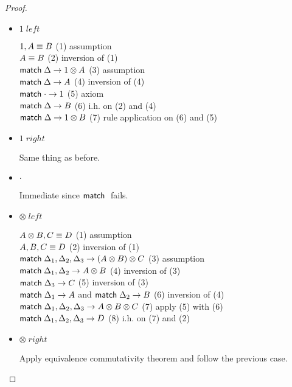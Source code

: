 \begin{proof}
\begin{itemize}
      \item $1 \; left$
      
      $1, A \equiv B$ \hfill (1) assumption \\
      $A \equiv B$ \hfill (2) inversion of (1) \\
      $\mathsf{match} \; \Delta \rightarrow 1 \otimes A$ \hfill (3) assumption \\
      $\mathsf{match} \; \Delta \rightarrow A$ \hfill (4) inversion of (4) \\
      $\mathsf{match} \; \cdot \rightarrow 1$ \hfill (5) axiom \\
      $\mathsf{match} \; \Delta \rightarrow B$ \hfill (6) i.h. on (2) and (4) \\
      $\mathsf{match} \; \Delta \rightarrow 1 \otimes B$ \hfill (7) rule application on (6) and (5) \\
      
      \item $1 \; right$
      
      Same thing as before.
      
      \item $\cdot$
      
      Immediate since $\mathsf{match} \;$ fails.
      
      \item $\otimes \; left$
      
      $A \otimes B, C \equiv D$ \hfill (1) assumption \\
      $A, B, C \equiv D$ \hfill (2) inversion of (1) \\
      $\mathsf{match} \; \Delta_1, \Delta_2, \Delta_3 \rightarrow (A \otimes B) \otimes C$ \hfill (3) assumption \\
      $\mathsf{match} \; \Delta_1, \Delta_2 \rightarrow A \otimes B$ \hfill (4) inversion of (3) \\
      $\mathsf{match} \; \Delta_3 \rightarrow C$ \hfill (5) inversion of (3) \\
      $\mathsf{match} \; \Delta_1 \rightarrow A$ and $\mathsf{match} \; \Delta_2 \rightarrow B$ \hfill (6) inversion of (4) \\
      $\mathsf{match} \; \Delta_1, \Delta_2, \Delta_3 \rightarrow A \otimes B \otimes C$ \hfill (7) apply (5) with (6) \\
      $\mathsf{match} \; \Delta_1, \Delta_2, \Delta_3 \rightarrow D$ \hfill (8) i.h. on (7) and (2)\\
      
      \item $\otimes \; right$
      
      Apply equivalence commutativity theorem and follow the previous case.
   \end{itemize}
\end{proof}
